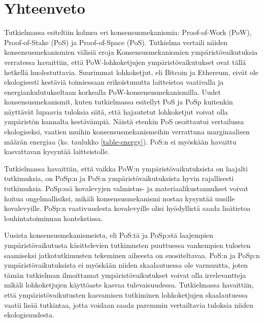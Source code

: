 \chapter{Yhteenveto\label{yhteenveto}}

Tutkielmassa esiteltiin kolmea eri konsensusmekanismia: Proof-of-Work (PoW), Proof-of-Stake (PoS) ja Proof-of-Space (PoS). Tutkielma vertaili näiden konsensusmekanismien välisiä eroja  Konsensusmekanismien ympäristövaikutuksia verratessa havaittiin, että PoW-lohkoketjujen ympäristövaikutukset ovat tällä hetkellä huolestuttavia. Suurimmat lohkoketjut, eli Bitcoin ja Ethereum, eivät ole ekologisesti kestäviä toimiessaan erikoistunutta laitteistoa vaativalla ja energiankulutukseltaan korkealla PoW-konsensusmekanismilla. Uudet konsensusmekanismit, kuten tutkielmassa esitellyt PoS ja PoSp kuitenkin näyttävät lupaavia tuloksia siitä, että hajautetut lohkoketjut voivat olla ympäristön kannalta kestävämpiä. Näistä etenkin PoS osoittautui vertailussa ekologiseksi, vaatien muihin konsensusmekanismeihin verrattuna marginaalisen määrän energiaa (ks. taulukko \ref{table-energy}). PoS:n ei myöskään havaittu kasvattavan kysyntää laitteistolle.



Tutkielmassa havaittiin, että vaikka PoW:n ympäristövaikutuksista on laajalti tutkimuksia, on PoSp:n ja PoS:n ympäristövaikutuksista hyvin rajallisesti tutkimuksia. PoSp:ssä kovalevyjen valmistus- ja materiaalikustannukset voivat koitua ongelmallisiksi, mikäli konsensusmekanismi nostaa kysyntää uusille kovalevyille. PoSp:n vaativuudesta kovalevyille olisi hyödyllistä saada lisätietoa louhintatoiminnan kontekstissa.

Uusista konsensusmekanismeista, eli PoS:tä ja PoSp:stä laajempien ympäristövaikutusta käsittelevien tutkimusten puuttuessa vankempien tulosten saamiseksi jatkotutkimusten tekeminen aiheesta on suositeltavaa. PoS:n ja PoSp:n ympäristövaikutuksista ei myöskään niiden skaalautuessa ole varmuutta, joten tämän tutkielman ilmoittamat ympäristövaikutukset voivat olla irrelevantteja mikäli lohkoketjujen käyttöaste kasvaa tulevaisuudessa. Tutkielmassa havaittiin, että ympäristövaikutusten kasvamisen tutkiminen lohkoketjujen skaalautuessa vaatii lisää tutkintaa, jotta voidaan saada paremmin vertailtavia tuloksia niiden ekologisuudesta.